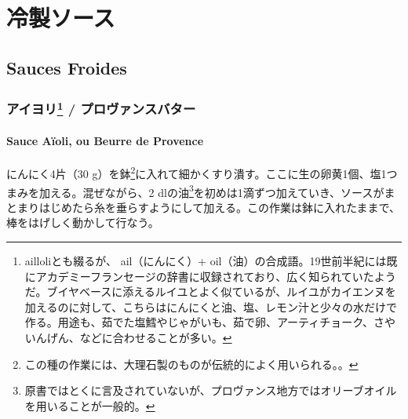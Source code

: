 \hypertarget{ux51b7ux88fdux30bdux30fcux30b9}{%
\section{冷製ソース}\label{ux51b7ux88fdux30bdux30fcux30b9}}

\hypertarget{sauces-froides}{%
\subsection{Sauces Froides}\label{sauces-froides}}

\begin{recette}
\hypertarget{ux30a2ux30a4ux30e8ux30ea2-ux30d7ux30edux30f4ux30a1ux30f3ux30b9ux30d0ux30bfux30fc}{%
\subsubsection[アイヨリ /
プロヴァンスバター]{\texorpdfstring{アイヨリ\footnote{ailloliとも綴るが、
  ail（にんにく）+
  oil（油）の合成語。19世前半紀には既にアカデミーフランセージの辞書に収録されており、広く知られていたようだ。ブイヤベースに添えるルイユとよく似ているが、ルイユがカイエンヌを加えるのに対して、こちらはにんにくと油、塩、レモン汁と少々の水だけで作る。用途も、茹でた塩鱈やじゃがいも、茹で卵、アーティチョーク、さやいんげん、などに合わせることが多い。}
/
プロヴァンスバター}{アイヨリ / プロヴァンスバター}}\label{ux30a2ux30a4ux30e8ux30ea2-ux30d7ux30edux30f4ux30a1ux30f3ux30b9ux30d0ux30bfux30fc}}

\hypertarget{sauce-aioli}{%
\paragraph{Sauce Aïoli, ou Beurre de Provence}\label{sauce-aioli}}


にんにく4片（30 g）を鉢\footnote{この種の作業には、大理石製のものが伝統的によく用いられる。。}に入れて細かくすり潰す。ここに生の卵黄1個、塩1つまみを加える。混ぜながら、2\undemi{}
dlの油\footnote{原書ではとくに言及されていないが、プロヴァンス地方ではオリーブオイルを用いることが一般的。}を初めは1滴ずつ加えていき、ソースがまとまりはじめたら糸を垂らすようにして加える。この作業は鉢に入れたままで、棒をはげしく動かして行なう。


\end{recette}
